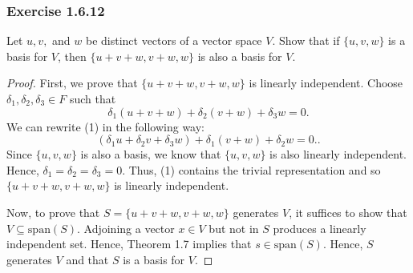 \subsubsection{Exercise 1.6.12}
Let \( u,v,  \) and \( w  \) be distinct vectors of a vector space \( V  \). Show that if \( \{ u,v,w \}  \) is a basis for \( V  \), then \( \{ u + v   + w , v + w , w  \}  \) is also a basis for \( V  \). 
\begin{proof}
    First, we prove that \( \{ u+v + w, v + w , w  \}   \) is linearly independent. Choose \( \delta_{1} , \delta_{2} , \delta_{3} \in F  \) such that 
    \[  \delta_{1} (u+v+w) + \delta_{2} (v +w) + \delta_{3} w = 0. \tag{1}  \]
    We can rewrite (1) in the following way:
    \[ (\delta_{1} u + \delta_{2} v + \delta_{3} w ) + \delta_{1} (v+w) + \delta_{2} w  = 0.  \tag{2}.  \]
    Since \( \{ u,v, w \}  \) is also a basis, we know that \( \{ u,v,w  \}   \) is also linearly independent. Hence, \( \delta_{1} = \delta_{2} = \delta_{3} = 0  \). Thus, (1) contains the trivial representation and so \( \{ u + v + w, v + w , w  \}  \) is linearly independent. 

    Now, to prove that \( S = \{ u+v+w, v + w , w  \}   \) generates \( V  \), it suffices to show that \( V \subseteq \text{span}(S) \). Adjoining a vector \( x \in  V  \) but not in \( S  \) produces a linearly independent set. Hence, Theorem 1.7 implies that \( s \in \text{span}(S) \). Hence, \( S  \) generates \( V   \) and that \( S  \) is a basis for \( V  \).

\end{proof}


